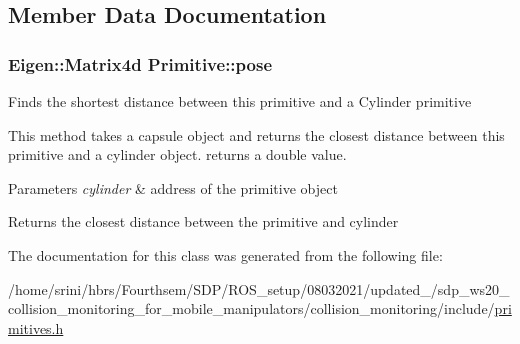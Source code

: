 \subsection{Member Data Documentation}
\subsubsection[{\texorpdfstring{pose}{pose}}]{\setlength{\rightskip}{0pt plus 5cm}Eigen\+::\+Matrix4d Primitive\+::pose}\hypertarget{class_primitive_ad8b2afbad412f6046783d155c88fe312}{}\label{class_primitive_ad8b2afbad412f6046783d155c88fe312}
Finds the shortest distance between this primitive and a Cylinder primitive

This method takes a capsule object and returns the closest distance between this primitive and a cylinder object. returns a double value.


\begin{DoxyParams}{Parameters}
{\em cylinder} & address of the primitive object \\
\hline
\end{DoxyParams}
\begin{DoxyReturn}{Returns}
the closest distance between the primitive and cylinder 
\end{DoxyReturn}


The documentation for this class was generated from the following file\+:\begin{DoxyCompactItemize}
\item 
/home/srini/hbrs/\+Fourthsem/\+S\+D\+P/\+R\+O\+S\+\_\+setup/08032021/updated\+\_/sdp\+\_\+ws20\+\_\+collision\+\_\+monitoring\+\_\+for\+\_\+mobile\+\_\+manipulators/collision\+\_\+monitoring/include/\hyperlink{primitives_8h}{primitives.\+h}\end{DoxyCompactItemize}
